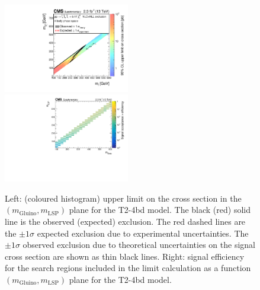\begin{figure}[t]
  \begin{center}
    \includegraphics[width=0.49\textwidth]{supplementary/figures/RA1T2-4bdXSEC} \, 
    \includegraphics[width=0.49\textwidth]{supplementary/figures/T2-4bd_merging_4_cats} \,     
  \end{center}
  \caption{Left: (coloured histogram) upper limit on the cross section in the $(m_{\mathrm{Gluino}},m_{\mathrm{LSP}})$ plane for the T2-4bd model. 
  The black (red) solid line is the observed (expected) exclusion. The red dashed lines are the $\pm1\sigma$ expected exclusion due to experimental uncertainties. 
  The $\pm1\sigma$ observed exclusion due to theoretical uncertainties on the signal cross section are shown as thin black lines. 
  Right: signal efficiency for the search regions included in the limit calculation as a function $(m_{\mathrm{Gluino}},m_{\mathrm{LSP}})$ plane for the T2-4bd model. 
  \label{fig:T2-4bd_excl}}
\end{figure}



